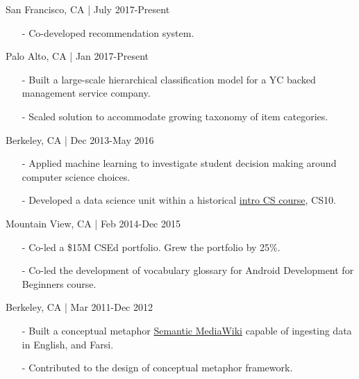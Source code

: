 \documentclass[11pt,article,oneside]{memoir}
\begin{document}
\bigskip


\medskip

 \hfill San Francisco, CA | July 2017-Present
\begin{itemize}[nolistsep]
\item[-]Co-developed recommendation system.
\end{itemize} 

 \hfill Palo Alto, CA | Jan 2017-Present
\begin{itemize}[nolistsep]
\item[-]Built a large-scale hierarchical classification model for a YC backed management service company.
\item[-]Scaled solution to accommodate growing taxonomy of item categories.
\end{itemize} 

 \hfill Berkeley, CA | Dec 2013-May 2016
\begin{itemize}[nolistsep]
\item[-] Applied machine learning to investigate student decision making around computer science choices.
\item[-] Developed a data science unit within a historical \href{http://www.whitehouse.gov/the-press-office/2014/12/08/fact-sheet-new-commitments-support-computer-science-education}{intro CS course}, CS10.
\end{itemize}  

 \hfill Mountain View, CA | Feb 2014-Dec 2015
\begin{itemize}[nolistsep]
\item[-]Co-led a \$15M CSEd portfolio. Grew the portfolio by 25\%.
\item[-]Co-led the development of vocabulary glossary for Android Development for Beginners course.
\end{itemize} 

 \hfill Berkeley, CA | Mar 2011-Dec 2012
\begin{itemize}[nolistsep]
\item[-] Built a conceptual metaphor \href{http://metaphor.icsi.berkeley.edu}{Semantic MediaWiki} capable of ingesting data in English, and Farsi.
\item[-] Contributed to the design of conceptual metaphor framework.
\end{itemize} 
\end{document}

